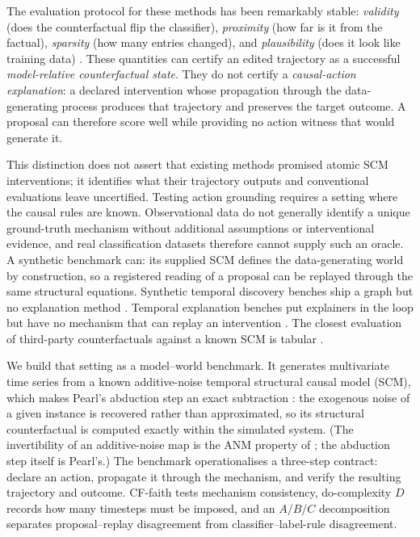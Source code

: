 \documentclass{article}
\begin{document}
The evaluation protocol for these methods has been remarkably stable: \emph{validity} (does the counterfactual flip the classifier), \emph{proximity} (how far is it from the factual), \emph{sparsity} (how many entries changed), and \emph{plausibility} (does it look like training data) \citep{delaney2021nativeguide,hollig2022tsevo,pawelczyk2021carla}. These quantities can certify an edited trajectory as a successful \emph{model-relative counterfactual state}. They do not certify a \emph{causal-action explanation}: a declared intervention whose propagation through the data-generating process produces that trajectory and preserves the target outcome. A proposal can therefore score well while providing no action witness that would generate it.

This distinction does not assert that existing methods promised atomic SCM interventions; it identifies what their trajectory outputs and conventional evaluations leave uncertified. Testing action grounding requires a setting where the causal rules are known. Observational data do not generally identify a unique ground-truth mechanism without additional assumptions or interventional evidence, and real classification datasets therefore cannot supply such an oracle. A synthetic benchmark can: its supplied SCM defines the data-generating world by construction, so a registered reading of a proposal can be replayed through the same structural equations. Synthetic temporal discovery benches ship a graph but no explanation method \citep{cheng2024causaltime,herdeanu2025causaldynamics,ferdous2025timegraph}. Temporal explanation benches put explainers in the loop but have no mechanism that can replay an intervention \citep{hollig2023xtscbench,nguyen2024amee}. The closest evaluation of third-party counterfactuals against a known SCM is tabular \citep{hollig2023semantic}.

We build that setting as a model--world benchmark. It generates multivariate time series from a known additive-noise temporal structural causal model (SCM), which makes Pearl's abduction step an exact subtraction \citep{pearl2009causality}: the exogenous noise of a given instance is recovered rather than approximated, so its structural counterfactual is computed exactly within the simulated system. (The invertibility of an additive-noise map is the ANM property of \citealp{hoyer2008anm}; the abduction step itself is Pearl's.) The benchmark operationalises a three-step contract: declare an action, propagate it through the mechanism, and verify the resulting trajectory and outcome. CF-faith tests mechanism consistency, do-complexity $D$ records how many timesteps must be imposed, and an $A/B/C$ decomposition separates proposal--replay disagreement from classifier--label-rule disagreement.
\end{document}
